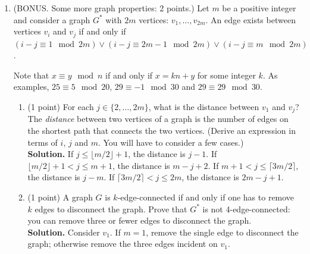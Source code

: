 \documentclass[11pt]{article}
\begin{document}
\begin{enumerate}
\item (BONUS. Some more graph properties: 2 points.) Let $m$ be a positive integer and consider a graph $G^{*}$ with $2m$ vertices: $v_{1}, \dots, v_{2m}$. An edge exists between vertices $v_{i}$ and $v_{j}$ if and only if $(i-j \equiv 1 \mod 2m) \vee (i-j \equiv 2m-1 \mod 2m) \vee (i-j \equiv m \mod 2m)$.
		
		Note that $x \equiv y \mod n$ if and only if $x = kn+y$ for some integer $k$. As examples, $25 \equiv 5 \mod 20$, $29 \equiv -1 \mod 30$ and $29 \equiv 29 \mod 30$.

	\begin{enumerate}
		\item (1 point) For each $j \in \{2, \dots, 2m\}$, what is the distance between $v_{1}$ and $v_{j}$? The {\em distance} between two vertices of a graph is the number of edges on the shortest path that connects the two vertices. (Derive an expression in terms of $i$, $j$ and $m$. You will have to consider a few cases.) \\

                   {\bf Solution.} If $j \le \lfloor m/2 \rfloor +1$, the distance is $j-1$. If $\lfloor m/2 \rfloor +1 < j \le m+1$, the distance is $m-j+2$. If $m+1 < j \le \lceil 3m/2 \rceil$, the distance is $j-m$. If $\lceil 3m/2 \rceil < j \le 2m$, the distance is $2m-j+1$.
                  
                  
		\item (1 point) A graph $G$ is $k$-edge-connected if and only if one has to remove $k$ edges to disconnect the graph. Prove that $G^{*}$ is not 4-edge-connected: you can remove three or fewer edges to disconnect the graph. \\

 {\bf Solution.} Consider $v_{1}$. If $m=1$, remove the single edge to disconnect the graph; otherwise remove the three edges incident on $v_{1}$.

\end{enumerate}


\end{enumerate}




%
%


% 
\end{document}
